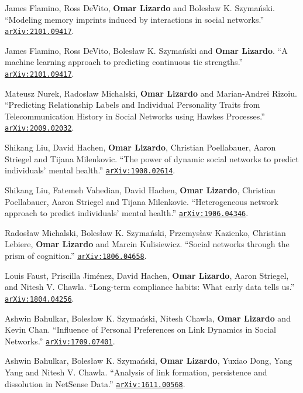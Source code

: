 
\ind James Flamino, Ross DeVito, {\bf Omar Lizardo} and Boles\l{}aw K. Szyma\'{n}ski. ``Modeling memory imprints induced by interactions in social networks.'' \href{https://arxiv.org/abs/2101.09417}{\nolinkurl{arXiv:2101.09417}}.

\ind James Flamino, Ross DeVito, Boles\l{}aw K. Szyma\'{n}ski and {\bf Omar Lizardo}. ``A machine learning approach to predicting continuous tie strengths.'' \href{https://arxiv.org/abs/2101.09417}{\nolinkurl{arXiv:2101.09417}}.

\ind Mateusz Nurek, Rados\l{}aw Michalski, {\bf Omar Lizardo} and Marian-Andrei Rizoiu. ``Predicting Relationship Labels and Individual Personality Traits from Telecommunication History in Social Networks using Hawkes Processes.'' \href{https://arxiv.org/abs/2009.02032}{\nolinkurl{arXiv:2009.02032}}.

\ind Shikang Liu, David Hachen, {\bf Omar Lizardo}, Christian Poellabauer, Aaron Striegel and Tijana Milenkovic. ``The power of dynamic social networks to predict individuals' mental health.'' \href{https://arxiv.org/abs/1908.02614}{\nolinkurl{arXiv:1908.02614}}.

\ind Shikang Liu, Fatemeh Vahedian, David Hachen, {\bf Omar Lizardo}, Christian Poellabauer, Aaron Striegel and Tijana Milenkovic. ``Heterogeneous network approach to predict individuals' mental health.'' \href{https://arxiv.org/abs/1906.04346}{\nolinkurl{arXiv:1906.04346}}.

\ind Rados\l{}aw Michalski, Boles\l{}aw K. Szyma\'{n}ski, Przemys\l{}aw Kazienko, Christian Lebiere, {\bf Omar Lizardo} and Marcin Kulisiewicz. ``Social networks through the prism of cognition.'' \href{https://arxiv.org/abs/1806.04658}{\nolinkurl{arXiv:1806.04658}}.

\ind Louis Faust, Priscilla Jim\'{e}nez, David Hachen, {\bf Omar Lizardo}, Aaron Striegel, and Nitesh V. Chawla. ``Long-term compliance habits: What early data tells us.'' \href{https://arxiv.org/abs/1804.04256}{\nolinkurl{arXiv:1804.04256}}.

\ind Ashwin Bahulkar, Boles\l{}aw K. Szyma\'{n}ski, Nitesh Chawla, {\bf Omar Lizardo} and Kevin Chan. ``Influence of Personal Preferences on Link Dynamics in Social Networks.'' \href{https://arxiv.org/abs/1709.07401}{\nolinkurl{arXiv:1709.07401}}.

\ind Ashwin Bahulkar, Boles\l{}aw K. Szyma\'{n}ski, {\bf Omar Lizardo}, Yuxiao Dong, Yang Yang and Nitesh V. Chawla. ``Analysis of link formation, persistence and dissolution in NetSense Data.'' \href{https://arxiv.org/abs/1611.00568}{\nolinkurl{arXiv:1611.00568}}.


